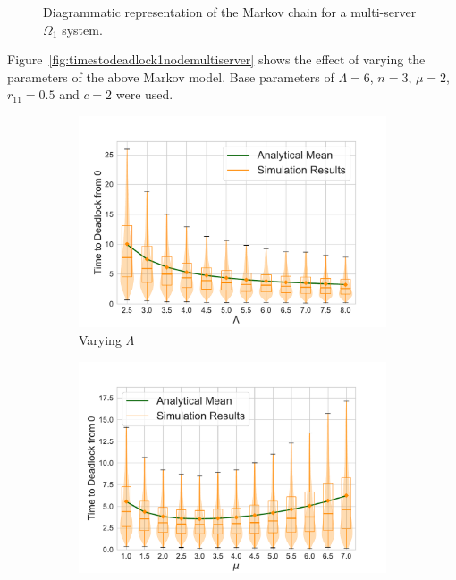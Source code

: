 \documentclass{article}
\numberwithin{equation}{section}
\begin{document}
\begin{figure}[!htbp]
    \begin{center}
    
    \end{center}
    \caption{Diagrammatic representation of the Markov chain for a
    multi-server $\Omega_1$ system.}
    \label{fig:1nodeMCms}
\end{figure}

Figure~\ref{fig:timestodeadlock1nodemultiserver} shows the effect of varying
the parameters of the above Markov model.
Base parameters of $\Lambda = 6$, $n = 3$, $\mu = 2$, $r_{11} = 0.5$ and
$c = 2$ were used.

\begin{figure}[!htbp]
  \begin{center}
  \begin{subfigure}[b]{0.48\textwidth}
    \includegraphics[width=\textwidth]{images/1Nms_varyL}
    \caption{Varying $\Lambda$}
    \label{fig:1Nms_L}
  \end{subfigure}
  \begin{subfigure}[b]{0.48\textwidth}
    \includegraphics[width=\textwidth]{images/1Nms_varymu}

\end{subfigure}
\end{center}
\end{figure}
\end{document}
